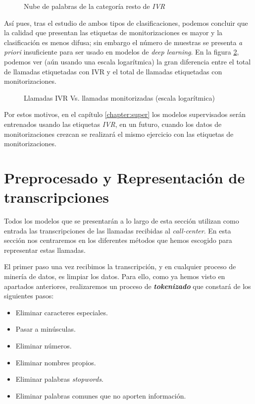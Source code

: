 \begin{figure}[!ht]
	\centering
    \caption{Nube de palabras de la categoría resto de \textit{IVR}}
    \label{fig:cloudivr_resto}
\end{figure} 
\FloatBarrier

Así pues, tras el estudio de ambos tipos de clasificaciones, podemos concluir que la calidad que presentan las etiquetas de monitorizaciones es mayor y la clasificación es menos difusa; sin embargo el número de muestras se presenta \textit{a priori} insuficiente para ser usado en modelos de \textit{deep learning}. En la figura \ref{fig:ivrvsmoni}, podemos ver (aún usando una escala logarítmica) la gran diferencia entre el total de llamadas etiquetadas con IVR y el total de llamadas etiquetadas con monitorizaciones.

\begin{figure}[!ht]
	\centering
    \caption{Llamadas IVR Vs. llamadas monitorizadas (escala logarítmica)}
    \label{fig:ivrvsmoni}
\end{figure} 




Por estos motivos, en el capítulo \ref{chapter:super} los modelos supervisados serán entrenados usando las etiquetas \textit{IVR}, en un futuro, cuando los datos de monitorizaciones crezcan se realizará el mismo ejercicio con las etiquetas de monitorizaciones. 


\section{Preprocesado y Representación de transcripciones}
\label{section:data:repr}



Todos los modelos que se presentarán a lo largo de esta sección utilizan como entrada las transcripciones de las llamadas recibidas al \textit{call-center}. En esta sección nos centraremos en los diferentes métodos que hemos escogido para representar estas llamadas.


El primer paso una vez recibimos la transcripción, y en cualquier proceso de minería de datos, es limpiar los datos. Para ello, como ya hemos visto en apartados anteriores, realizaremos un proceso de \textit{\textbf{tokenizado}} que constará de los siguientes pasos: 

\begin{itemize}
\item Eliminar caracteres especiales. 
\item Pasar a minúsculas. 
\item Eliminar números. 
\item Eliminar nombres propios. 
\item Eliminar palabras \textit{stopwords}. 
\item Eliminar palabras comunes que no aporten información.
\end{itemize}


